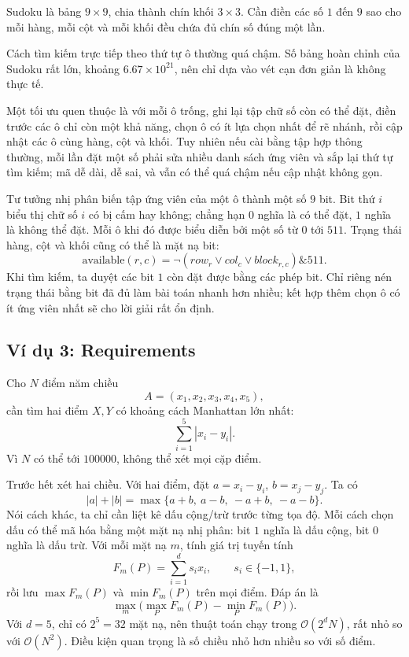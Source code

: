 \documentclass[11pt]{article}
\newcommand{\Oh}{\mathcal{O}}
\begin{document}
Sudoku là bảng \(9\times 9\), chia thành chín khối \(3\times 3\). Cần điền
các số \(1\) đến \(9\) sao cho mỗi hàng, mỗi cột và mỗi khối đều chứa đủ
chín số đúng một lần.

Cách tìm kiếm trực tiếp theo thứ tự ô thường quá chậm. Số bảng hoàn chỉnh của
Sudoku rất lớn, khoảng \(6.67\times 10^{21}\), nên chỉ dựa vào vét cạn đơn
giản là không thực tế.

Một tối ưu quen thuộc là với mỗi ô trống, ghi lại tập chữ số còn có thể đặt,
điền trước các ô chỉ còn một khả năng, chọn ô có ít lựa chọn nhất để rẽ nhánh,
rồi cập nhật các ô cùng hàng, cột và khối. Tuy nhiên nếu cài bằng tập hợp
thông thường, mỗi lần đặt một số phải sửa nhiều danh sách ứng viên và sắp lại
thứ tự tìm kiếm; mã dễ dài, dễ sai, và vẫn có thể quá chậm nếu cập nhật không
gọn.

Tư tưởng nhị phân biến tập ứng viên của một ô thành một số \(9\) bit. Bit thứ
\(i\) biểu thị chữ số \(i\) có bị cấm hay không; chẳng hạn \(0\) nghĩa là có
thể đặt, \(1\) nghĩa là không thể đặt. Mỗi ô khi đó được biểu diễn bởi một
số từ \(0\) tới \(511\). Trạng thái hàng, cột và khối cũng có thể là mặt nạ
bit:
\[
  \text{available}(r,c)=\neg(row_r\lor col_c\lor block_{r,c}) \mathbin{\&} 511.
\]
Khi tìm kiếm, ta duyệt các bit \(1\) còn đặt được bằng các phép bit. Chỉ riêng
nén trạng thái bằng bit đã đủ làm bài toán nhanh hơn nhiều; kết hợp thêm chọn
ô có ít ứng viên nhất sẽ cho lời giải rất ổn định.

\subsection{Ví dụ 3: Requirements}

Cho \(N\) điểm năm chiều
\[
  A=(x_1,x_2,x_3,x_4,x_5),
\]
cần tìm hai điểm \(X,Y\) có khoảng cách Manhattan lớn nhất:
\[
  \sum_{i=1}^{5}|x_i-y_i|.
\]
Vì \(N\) có thể tới \(100000\), không thể xét mọi cặp điểm.

Trước hết xét hai chiều. Với hai điểm, đặt \(a=x_i-y_i\), \(b=x_j-y_j\). Ta
có
\[
|a|+|b|
=\max\{a+b,\ a-b,\ -a+b,\ -a-b\}.
\]
Nói cách khác, ta chỉ cần liệt kê dấu cộng/trừ trước từng tọa độ. Mỗi cách
chọn dấu có thể mã hóa bằng một mặt nạ nhị phân: bit \(1\) nghĩa là dấu cộng,
bit \(0\) nghĩa là dấu trừ. Với mỗi mặt nạ \(m\), tính giá trị tuyến tính
\[
  F_m(P)=\sum_{i=1}^{d} s_i x_i,\qquad s_i\in\{-1,1\},
\]
rồi lưu \(\max F_m(P)\) và \(\min F_m(P)\) trên mọi điểm. Đáp án là
\[
  \max_m \bigl(\max_P F_m(P)-\min_P F_m(P)\bigr).
\]
Với \(d=5\), chỉ có \(2^5=32\) mặt nạ, nên thuật toán chạy trong
\(\Oh(2^dN)\), rất nhỏ so với \(\Oh(N^2)\). Điều kiện quan trọng là số chiều
nhỏ hơn nhiều so với số điểm.
\end{document}
